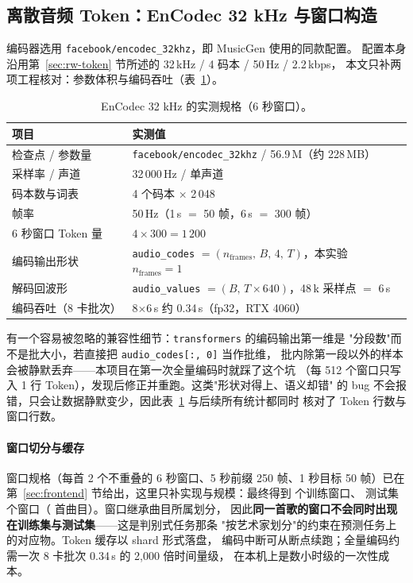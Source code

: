 \subsection{离散音频 Token：EnCodec 32 kHz 与窗口构造}\label{sec:encodec}

编码器选用 \texttt{facebook/encodec\_32khz}，即 MusicGen 使用的同款配置。
配置本身沿用第~\ref{sec:rw-token} 节所述的 32\,kHz / 4 码本 / 50\,Hz / 2.2\,kbps，
本文只补两项工程核对：参数体积与编码吞吐（表~\ref{tab:encodec}）。

\begin{table}[H]
\centering\small
\caption{EnCodec 32 kHz 的实测规格（6 秒窗口）。}\label{tab:encodec}
\begin{tabular}{ll}
\toprule
项目 & 实测值\\
\midrule
检查点 / 参数量 & \texttt{facebook/encodec\_32khz} / 56.9\,M（约 228\,MB）\\
采样率 / 声道 & 32\,000\,Hz / 单声道\\
码本数与词表 & 4 个码本 $\times$ 2\,048\\
帧率 & 50\,Hz（1\,s $=$ 50 帧，6\,s $=$ 300 帧）\\
6 秒窗口 Token 量 & $4 \times 300 = 1\,200$\\
编码输出形状 & \texttt{audio\_codes} $=(n_{\text{frames}},\,B,\,4,\,T)$，本实验 $n_{\text{frames}}=1$\\
解码回波形 & \texttt{audio\_values} $=(B,\,T\times 640)$，48\,k 采样点 $=$ 6\,s\\
编码吞吐（8 卡批次） & 8$\times$6\,s 约 0.34\,s（fp32，RTX 4060）\\
\bottomrule
\end{tabular}
\end{table}

有一个容易被忽略的兼容性细节：\texttt{transformers} 的编码输出第一维是
"分段数"而不是批大小，若直接把 \texttt{audio\_codes[:, 0]} 当作批维，
批内除第一段以外的样本会被静默丢弃——本项目在第一次全量编码时就踩了这个坑
（每 512 个窗口只写入 1 行 Token），发现后修正并重跑。这类"形状对得上、语义却错"
的 bug 不会报错，只会让数据静默变少，因此表~\ref{tab:encodec} 与后续所有统计都同时
核对了 Token 行数与窗口行数。

\paragraph{窗口切分与缓存}
窗口规格（每首 2 个不重叠的 6 秒窗口、5 秒前缀 250 帧、1 秒目标 50 帧）已在
第~\ref{sec:frontend} 节给出，这里只补实现与规模：最终得到 \TokNTrain{} 个训练窗口、
测试集 \TokNTest{} 个窗口（\TokNTracks{} 首曲目）。窗口继承曲目所属划分，
因此\textbf{同一首歌的窗口不会同时出现在训练集与测试集}——这是判别式任务那条
"按艺术家划分"的约束在预测任务上的对应物。Token 缓存以 shard 形式落盘，
编码中断可从断点续跑；全量编码约需一次 8 卡批次 0.34\,s 的 2,000 倍时间量级，
在本机上是数小时级的一次性成本。

